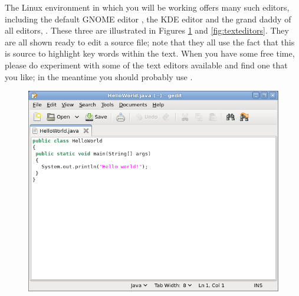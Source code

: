 The Linux environment in which you will be working offers many such
editors, including the default GNOME editor , the KDE
editor  and the grand daddy of all editors,
. These three are illustrated in Figures \ref{fig:gedit}
and \ref{fig:texteditors}. They are all shown ready to edit a
 source file; note that they all use the fact that this is
 source to highlight key words within the text. When you
have some free time, please do experiment with some of the text
editors available and find one that you like; in the meantime you
should probably use .

\begin{figure}
  \centering
\includegraphics[width=.7\textwidth]{images/gedit}  
  \caption{}
  \label{fig:gedit}
\end{figure}

